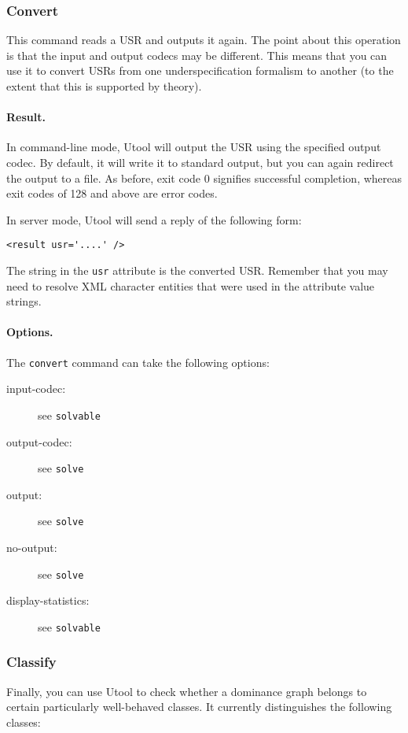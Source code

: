 \subsubsection{Convert}

This command reads a USR and outputs it again. The point about this
operation is that the input and output codecs may be different. This
means that you can use it to convert USRs from one underspecification
formalism to another (to the extent that this is supported by theory).

\paragraph{Result.}
In command-line mode, Utool will output the USR using the specified
output codec. By default, it will write it to standard output, but you
can again redirect the output to a file. As before, exit code 0
signifies successful completion, whereas exit codes of 128 and above
are error codes.

In server mode, Utool will send a reply of the following form:
\begin{verbatim}
<result usr='....' />
\end{verbatim}

The string in the \verb?usr? attribute is the converted USR. Remember
that you may need to resolve XML character entities that were used in
the attribute value strings.

\paragraph{Options.}
The \verb?convert? command can take the following options:
\begin{description}
\item[input-codec:] see \verb?solvable? 
\item[output-codec:] see \verb?solve? 
\item[output:] see \verb?solve?
\item[no-output:] see \verb?solve?
\item[display-statistics:] see \verb?solvable?
\end{description}



\subsubsection{Classify}

Finally, you can use Utool to check whether a dominance graph belongs
to certain particularly well-behaved classes. It currently
distinguishes the following classes:


